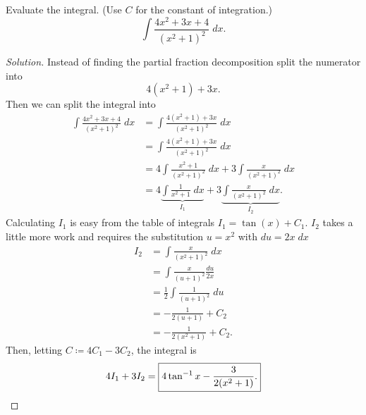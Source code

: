 \begin{problem}[WebAssign, HW 14, \# 2]
Evaluate the integral. (Use $C$ for the constant of integration.)
\[
\int\frac{4x^2+3x+4}{(x^2+1)^2}\;dx.
\]
\end{problem}
\begin{proof}[Solution]
Instead of finding the partial fraction decomposition split the numerator
into
\[
4(x^2+1)+3x.
\]
Then we can split the integral into
\begin{align*}
\int\frac{4x^2+3x+4}{(x^2+1)^2}\;dx
&=\int\frac{4(x^2+1)+3x}{(x^2+1)^2}\;dx\\
&=\int\frac{4(x^2+1)+3x}{(x^2+1)^2}\;dx\\
&=4\int\frac{x^2+1}{(x^2+1)^2}\;dx
+3\int\frac{x}{(x^2+1)^2}\;dx\\
&=4\underbrace{\int\frac{1}{x^2+1}\;dx}_{I_1}
+3\underbrace{\int\frac{x}{(x^2+1)^2}\;dx}_{I_2}.
\end{align*}
Calculating $I_1$ is easy from the table of integrals
$I_1=\tan(x)+C_1$. $I_2$ takes a little more work and requires the
substitution $u=x^2$ with $du=2x\;dx$
\begin{align*}
I_2
&=\int\frac{x}{(x^2+1)^2}\;dx\\
&=\int\frac{x}{(u+1)^2}\frac{du}{2x}\\
&=\frac{1}{2}\int\frac{1}{(u+1)^2}\;du\\
&=-\frac{1}{2(u+1)}+C_2\\
&=-\frac{1}{2(x^2+1)}+C_2.
\end{align*}
Then, letting $C\coloneqq 4C_1-3C_2$, the integral is
\[
4I_1+3I_2=\boxed{4\tan^{-1} x-\frac{3}{2(x^2+1)}.}\qedhere
\]
\end{proof}

